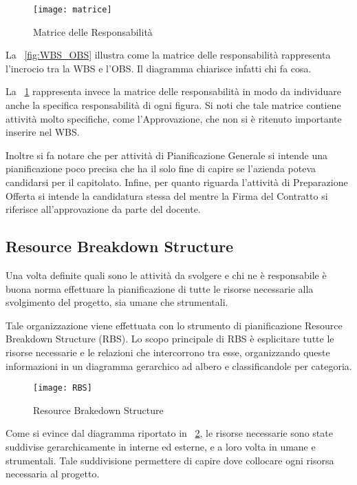 \clearpage
\begin{figure}[!h]
  \texttt{[image: matrice]}
  	\label{fig:MATR}
	\caption{Matrice delle Responsabilità}
\end{figure}

La \figurename~\ref{fig:WBS_OBS} illustra come la matrice delle responsabilità rappresenta l'incrocio tra la WBS e l'OBS. Il diagramma chiarisce infatti chi fa cosa.

La \figurename~\ref{fig:MATR} rappresenta invece la matrice delle responsabilità in modo da individuare anche la specifica responsabilità di ogni figura. Si noti che tale matrice contiene attività molto specifiche, come l'Approvazione, che non si è ritenuto importante inserire nel WBS.

Inoltre si fa notare che per attività di Pianificazione Generale si intende una pianificazione poco precisa che ha il solo fine di capire se l'azienda poteva candidarsi per il capitolato. Infine, per quanto riguarda l'attività di Preparazione Offerta si intende la candidatura stessa del  mentre la Firma del Contratto si riferisce all'approvazione da parte del docente.

\subsection{Resource Breakdown Structure}
Una volta definite quali sono le attività da svolgere e chi ne è responsabile è buona norma effettuare la pianificazione di tutte le risorse necessarie alla svolgimento del progetto, sia umane che strumentali.

Tale organizzazione viene effettuata con lo strumento di pianificazione Resource Breakdown Structure (RBS).
Lo scopo principale di RBS è esplicitare tutte le risorse necessarie e le relazioni che intercorrono tra esse, organizzando queste informazioni in un diagramma gerarchico ad albero e classificandole per categoria.

\begin{landscape}
\vskip 2in

\begin{figure}
\centering
  \texttt{[image: RBS]}
  	
	\caption{Resource Brakedown Structure}
	\label{fig:RBS}
\end{figure}

\end{landscape}

Come si evince dal diagramma riportato in \figurename~\ref{fig:RBS}, le risorse necessarie sono state suddivise gerarchicamente in interne ed esterne, e a loro volta in umane e strumentali. Tale suddivisione permettere di capire dove collocare ogni risorsa necessaria al progetto.

